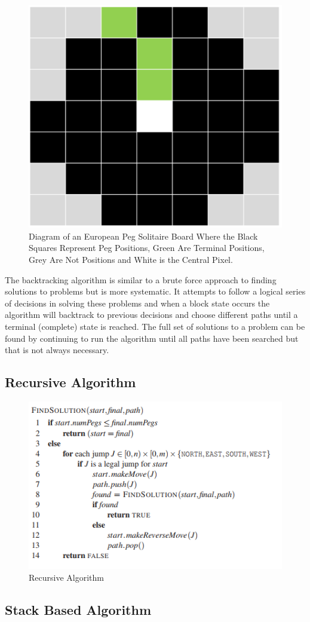 \documentclass[a4paper]{article}
\begin{document}
\begin{figure}[H]
	\centering
	\label{board}
	\includegraphics[width=.50\textwidth,scale=.50]{images/board}
	\caption{Diagram of an European Peg Solitaire Board Where the
				Black Squares Represent Peg Positions,
				Green Are Terminal Positions,
				Grey Are Not Positions and
				White is the Central Pixel.
			}
\end{figure}


\noindent The backtracking algorithm is similar to a brute force approach to finding solutions to problems but is more systematic. It attempts to follow a logical series of decisions in solving these problems and when a block state occurs the algorithm will backtrack to previous decisions and choose different paths until a terminal (complete) state is reached. The full set of solutions to a problem can be found by continuing to run the algorithm until all paths have been searched but that is not always necessary.

\subsection{Recursive Algorithm}
\begin{figure}[H]
	\centering
	\includegraphics[width=.50\textwidth,scale=.50]{images/recursive_algorithm}
	\caption{Recursive Algorithm \cite{lab5}}
\end{figure}

\subsection{Stack Based Algorithm}
\end{document}

